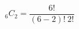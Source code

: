 \documentclass[preview]{standalone}
\begin{document}
\begin{center}
\[{}_6C_2 = \frac{ \: 6! \: }{(6-2)! \: 2!}\]
\end{center}
\end{document}
